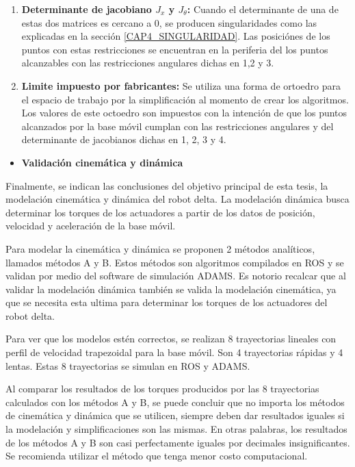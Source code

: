 \begin{enumerate}
                    \item{\textbf{Determinante de jacobiano $J_{x}$ y $J_{\theta}$: } Cuando el determinante de una de estas dos matrices es cercano a 0, se producen singularidades como las explicadas en la sección \eqref{CAP4_SINGULARIDAD}. Las posiciónes de los puntos con estas restricciones se encuentran en la periferia del los puntos alcanzables con las restricciones angulares dichas en 1,2 y 3.} 
                    \item{\textbf{Limite impuesto por fabricantes: } Se utiliza una forma de ortoedro para el espacio de trabajo por la simplificación al momento de crear los algoritmos. Los valores de este octoedro son impuestos con la intención de que los puntos alcanzados por la base móvil cumplan con las restricciones angulares y del determinante de jacobianos dichas  en 1, 2, 3 y 4.  }
                \end{enumerate}  
            
            
            
             \begin{itemize}
                 \item  \textbf{Validación cinemática y dinámica} 
             \end{itemize}
             
            Finalmente, se indican las conclusiones del objetivo principal de esta tesis, la modelación cinemática y dinámica del robot delta. La modelación dinámica busca determinar los torques de los actuadores a partir de los datos de posición, velocidad y aceleración de la base móvil.
            
            Para modelar la cinemática y dinámica se proponen 2 métodos analíticos, llamados métodos A y B. Estos métodos son algoritmos compilados en ROS y se validan por medio del software de simulación ADAMS. Es notorio recalcar que al validar la modelación dinámica también se valida la modelación cinemática, ya que se necesita esta ultima para determinar los torques de los actuadores del robot delta.
            
            Para ver que los modelos estén correctos, se realizan 8 trayectorias lineales con perfil de velocidad trapezoidal para la base móvil. Son 4 trayectorias rápidas y 4 lentas. Estas 8 trayectorias se simulan en ROS y ADAMS.
            
            Al comparar los resultados de los torques producidos por las 8 trayectorias calculados con los métodos A y B, se puede concluir que no importa los métodos de cinemática y dinámica que se utilicen, siempre deben dar resultados iguales si la modelación y simplificaciones son las mismas. En otras palabras, los resultados de los métodos A y B son casi perfectamente iguales por decimales insignificantes. Se recomienda utilizar el método que tenga menor costo computacional. 
            

